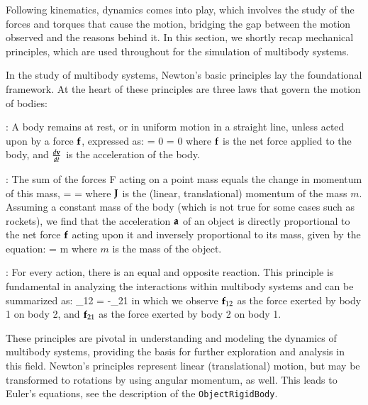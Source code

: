 Following kinematics, dynamics comes into play, which involves the study of the forces and torques that cause the motion, bridging the gap between the motion observed and the reasons behind it.
In this section, we shortly recap mechanical principles, which are used throughout for the simulation of multibody systems.

In the study of multibody systems, Newton's basic principles lay the foundational framework. At the heart of these principles are three laws that govern the motion of bodies:

\noindent {}: A body remains at rest, or in uniform motion in a straight line, unless acted upon by a force $\mathbf{f}$, expressed as:
\be
  \fv = 0 \implies {} = 0
\ee
where $\mathbf{f}$ is the net force applied to the body, and $\frac{d\mathbf{v}}{dt}$ is the acceleration of the body.

\noindent{}: The sum of the forces F acting on a point mass equals the change in momentum of this mass, 
\be
  \fv=  = \dot \Jm 
\ee
where $\mathbf{J}$ is the (linear, translational) momentum of the mass $m$. Assuming a constant mass of the body (which is not true for some cases such as rockets), we find that the acceleration $\mathbf{a}$ of an object is directly proportional to the net force $\mathbf{f}$ acting upon it and inversely proportional to its mass, given by the equation:
\be \label{eq:theory:newton:fma}
  \fv= m \av
\ee
where $m$ is the mass of the object.
  
\noindent {}: For every action, there is an equal and opposite reaction. This principle is fundamental in analyzing the interactions within multibody systems and can be summarized as:
\be
  \fv_{12} = -\fv_{21}
\ee
in which we observe $\mathbf{f}_{12}$ as the force exerted by body 1 on body 2, and $\mathbf{f}_{21}$ as the force exerted by body 2 on body 1.

These principles are pivotal in understanding and modeling the dynamics of multibody systems, providing the basis for further exploration and analysis in this field.
Newton's principles represent linear (translational) motion, but may be transformed to rotations by using angular momentum, as well. This leads to Euler's equations, see the description of the \texttt{ObjectRigidBody}.

